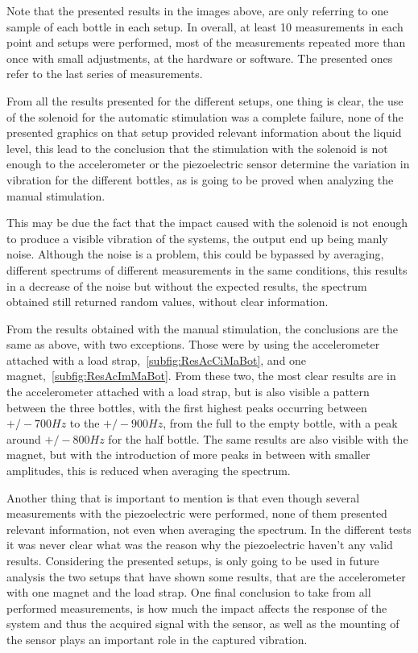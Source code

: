 Note that the presented results in the images above, are only referring to one sample of each bottle in each setup. In overall, at least 10 measurements in each point and setups were performed, most of the measurements repeated more than once with small adjustments, at the hardware or software. The presented ones refer to the last series of measurements. %

From all the results presented for the different setups, one thing is clear, the use of the solenoid for the automatic stimulation was a complete failure, none of the presented graphics on that setup provided relevant information about the liquid level, this lead to the conclusion that the stimulation with the solenoid is not enough to the accelerometer or the piezoelectric sensor determine the variation in vibration for the different bottles, as is going to be proved when analyzing the manual stimulation. 

This may be due the fact that the impact caused with the solenoid is not enough to produce a visible vibration of the systems, the output end up being manly noise. Although the noise is a problem, this could be bypassed by averaging, different spectrums of different measurements in the same conditions, this results in a decrease of the noise but without the expected results, the spectrum obtained still returned random values, without clear information.

From the results obtained with the manual stimulation, the conclusions are the same as above, with two exceptions. Those were by using the accelerometer attached with a load strap,~\ref{subfig:ResAcCiMaBot}, and one magnet,~\ref{subfig:ResAcImMaBot}. From these two, the most clear results are in the accelerometer attached with a load strap, but is also visible a pattern between the three bottles, with the first highest peaks occurring between $+/- 700Hz$ to the $+/-900Hz$, from the full to the empty bottle, with a peak around $+/-800Hz$ for the half bottle. The same results are also visible with the magnet, but with the introduction of more peaks in between with smaller amplitudes, this is reduced when averaging the spectrum.

Another thing that is important to mention is that even though several measurements with the piezoelectric were performed, none of them presented relevant information, not even when averaging the spectrum. In the different tests it was never clear what was the reason why the piezoelectric haven't any valid results. 
Considering the presented setups, is only going to be used in future analysis the two setups that have shown some results, that are the accelerometer with one magnet and the load strap. One final conclusion to take from all performed measurements, is how much the impact affects the response of the system and thus the acquired signal with the sensor, as well as the mounting of the sensor plays an important role in the captured vibration.
